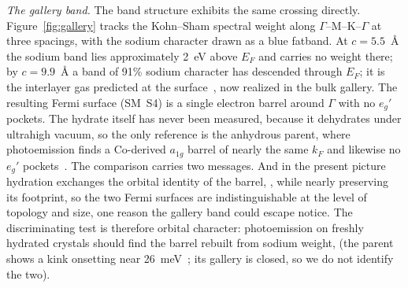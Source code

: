 \documentclass[aps,prl,twocolumn,superscriptaddress,floatfix]{revtex4-2}
\begin{document}
\textit{The gallery band.} The band structure exhibits the same crossing directly.
Figure~\ref{fig:gallery} tracks
the Kohn--Sham spectral weight along $\Gamma$--M--K--$\Gamma$ at three spacings, with the sodium
character drawn as a blue fatband. At $c=5.5$~\AA{} the sodium band lies approximately 2~eV above
$E_F$ and carries no weight there; by $c=9.9$~\AA{} a band of 91\% sodium character has descended
through $E_F$; it is the interlayer gas predicted at the surface~\cite{RadhaLambrecht2021}, now
realized in the bulk gallery. The resulting Fermi surface (SM~S4) is a single electron barrel
around $\Gamma$ with no $e_g'$ pockets. The hydrate itself has never been measured, because it
dehydrates under ultrahigh vacuum, so the only reference is the anhydrous parent, where
photoemission finds a Co-derived $a_{1g}$ barrel of nearly the same $k_F$ and likewise no $e_g'$
pockets~\cite{Geck2007}. The comparison carries two messages.  And in the present picture hydration exchanges the orbital identity of the
barrel, , while nearly preserving its footprint, so the two Fermi
surfaces are indistinguishable at the level of topology and size, one reason the gallery band
could escape notice. The discriminating test is therefore orbital character: photoemission on
freshly hydrated crystals should find the barrel rebuilt from sodium weight,  (the parent shows a kink onsetting
near 26~meV~\cite{Geck2007}; its gallery is closed, so we do not identify the two).
\end{document}
